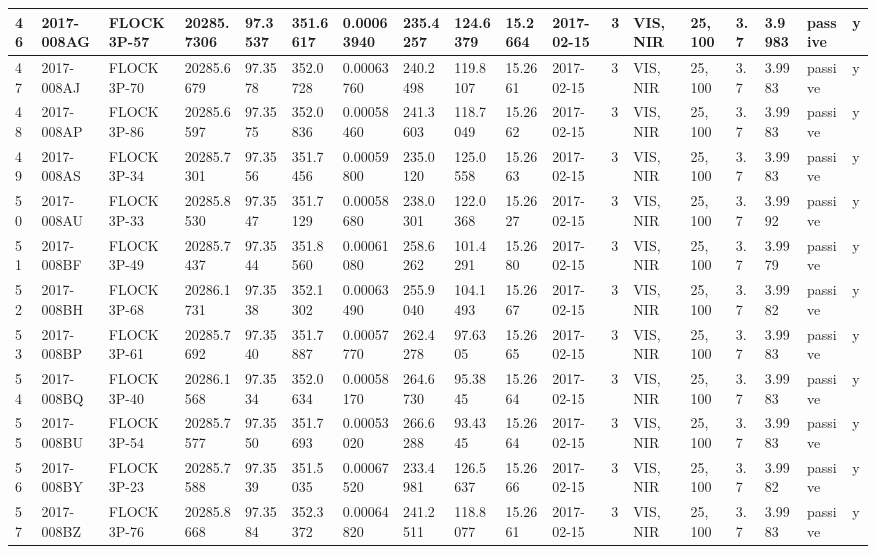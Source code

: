 \documentclass[12pt,a4paper,notitlepage,twoside,openright]{report}
\begin{document}
\begin{longtable}{|l|l|l|l|l|l|l|l|l|l|l|l|l|l|l|l|l|l|}
        46 & 2017-008AG & FLOCK 3P-57 & 20285.7306 & 97.3537 & 351.6617 & 0.00063940 & 235.4257 & 124.6379 & 15.2664 & 2017-02-15 & 3 & VIS, NIR & 25, 100 & 3.7 & 3.9983 & passive & y \\ \hline
        47 & 2017-008AJ & FLOCK 3P-70 & 20285.6679 & 97.3578 & 352.0728 & 0.00063760 & 240.2498 & 119.8107 & 15.2661 & 2017-02-15 & 3 & VIS, NIR & 25, 100 & 3.7 & 3.9983 & passive & y \\ \hline
        48 & 2017-008AP & FLOCK 3P-86 & 20285.6597 & 97.3575 & 352.0836 & 0.00058460 & 241.3603 & 118.7049 & 15.2662 & 2017-02-15 & 3 & VIS, NIR & 25, 100 & 3.7 & 3.9983 & passive & y \\ \hline
        49 & 2017-008AS & FLOCK 3P-34 & 20285.7301 & 97.3556 & 351.7456 & 0.00059800 & 235.0120 & 125.0558 & 15.2663 & 2017-02-15 & 3 & VIS, NIR & 25, 100 & 3.7 & 3.9983 & passive & y \\ \hline
        50 & 2017-008AU & FLOCK 3P-33 & 20285.8530 & 97.3547 & 351.7129 & 0.00058680 & 238.0301 & 122.0368 & 15.2627 & 2017-02-15 & 3 & VIS, NIR & 25, 100 & 3.7 & 3.9992 & passive & y \\ \hline
        51 & 2017-008BF & FLOCK 3P-49 & 20285.7437 & 97.3544 & 351.8560 & 0.00061080 & 258.6262 & 101.4291 & 15.2680 & 2017-02-15 & 3 & VIS, NIR & 25, 100 & 3.7 & 3.9979 & passive & y \\ \hline
        52 & 2017-008BH & FLOCK 3P-68 & 20286.1731 & 97.3538 & 352.1302 & 0.00063490 & 255.9040 & 104.1493 & 15.2667 & 2017-02-15 & 3 & VIS, NIR & 25, 100 & 3.7 & 3.9982 & passive & y \\ \hline
        53 & 2017-008BP & FLOCK 3P-61 & 20285.7692 & 97.3540 & 351.7887 & 0.00057770 & 262.4278 & 97.6305 & 15.2665 & 2017-02-15 & 3 & VIS, NIR & 25, 100 & 3.7 & 3.9983 & passive & y \\ \hline
        54 & 2017-008BQ & FLOCK 3P-40 & 20286.1568 & 97.3534 & 352.0634 & 0.00058170 & 264.6730 & 95.3845 & 15.2664 & 2017-02-15 & 3 & VIS, NIR & 25, 100 & 3.7 & 3.9983 & passive & y \\ \hline
        55 & 2017-008BU & FLOCK 3P-54 & 20285.7577 & 97.3550 & 351.7693 & 0.00053020 & 266.6288 & 93.4345 & 15.2664 & 2017-02-15 & 3 & VIS, NIR & 25, 100 & 3.7 & 3.9983 & passive & y \\ \hline
        56 & 2017-008BY & FLOCK 3P-23 & 20285.7588 & 97.3539 & 351.5035 & 0.00067520 & 233.4981 & 126.5637 & 15.2666 & 2017-02-15 & 3 & VIS, NIR & 25, 100 & 3.7 & 3.9982 & passive & y \\ \hline
        57 & 2017-008BZ & FLOCK 3P-76 & 20285.8668 & 97.3584 & 352.3372 & 0.00064820 & 241.2511 & 118.8077 & 15.2661 & 2017-02-15 & 3 & VIS, NIR & 25, 100 & 3.7 & 3.9983 & passive & y \\ \hline

\end{longtable}
\end{document}
